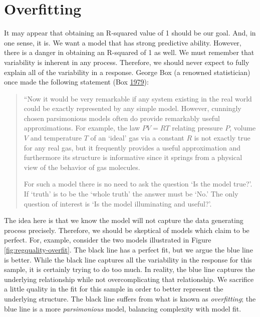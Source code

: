 \documentclass[]{book}
\theoremstyle{definition}
\theoremstyle{definition}
\theoremstyle{definition}
\theoremstyle{remark}
\begin{document}
\section{Overfitting}\label{overfitting}

It may appear that obtaining an R-squared value of 1 should be our goal.
And, in one sense, it is. We want a model that has strong predictive
ability. However, there is a danger in obtaining an R-squared of 1 as
well. We must remember that variability is inherent in any process.
Therefore, we should never expect to fully explain all of the
variability in a response. George Box (a renowned statistician) once
made the following statement (Box
\protect\hyperlink{ref-Box1979}{1979}):

\begin{quote}
``Now it would be very remarkable if any system existing in the real
world could be exactly represented by any simple model. However,
cunningly chosen parsimonious models often do provide remarkably useful
approximations. For example, the law \(PV = RT\) relating pressure
\(P\), volume \(V\) and temperature \(T\) of an `ideal' gas via a
constant \(R\) is not exactly true for any real gas, but it frequently
provides a useful approximation and furthermore its structure is
informative since it springs from a physical view of the behavior of gas
molecules.

For such a model there is no need to ask the question `Is the model
true?'. If `truth' is to be the `whole truth' the answer must be `No.'
The only question of interest is `Is the model illuminating and
useful?'.
\end{quote}

The idea here is that we know the model will not capture the data
generating process precisely. Therefore, we should be skeptical of
models which claim to be perfect. For, example, consider the two models
illustrated in Figure \ref{fig:regquality-overfit}. The black line has a
perfect fit, but we argue the blue line is better. While the black line
captures all the variability in the response for this sample, it is
certainly trying to do too much. In reality, the blue line captures the
underlying relationship while not overcomplicating that relationship. We
sacrifice a little quality in the fit for this sample in order to better
represent the underlying structure. The black line suffers from what is
known as \emph{overfitting}; the blue line is a more \emph{parsimonious}
model, balancing complexity with model fit.
\end{document}
